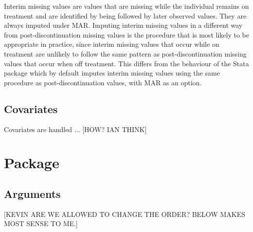 Interim missing values are values that are missing while the individual remains on treatment and are identified by being followed by later observed values. They are always imputed under MAR. Imputing interim missing values in a different way from post-discontinuation missing values is the procedure that is most likely to be appropriate in practice, since interim missing values that occur while on treatment are unlikely to follow the same pattern as post-discontinuation missing values that occur when off treatment. This differs from the behaviour of the Stata package \citep{Cro++16} which by default imputes interim missing values using the same procedure as post-discontinuation values, with MAR as an option.

\subsection{Covariates}

Covariates are handled ... [HOW? IAN THINK]


\section{Package}

\subsection{Arguments} [KEVIN ARE WE ALLOWED TO CHANGE THE ORDER? BELOW MAKES MOST SENSE TO ME.]

